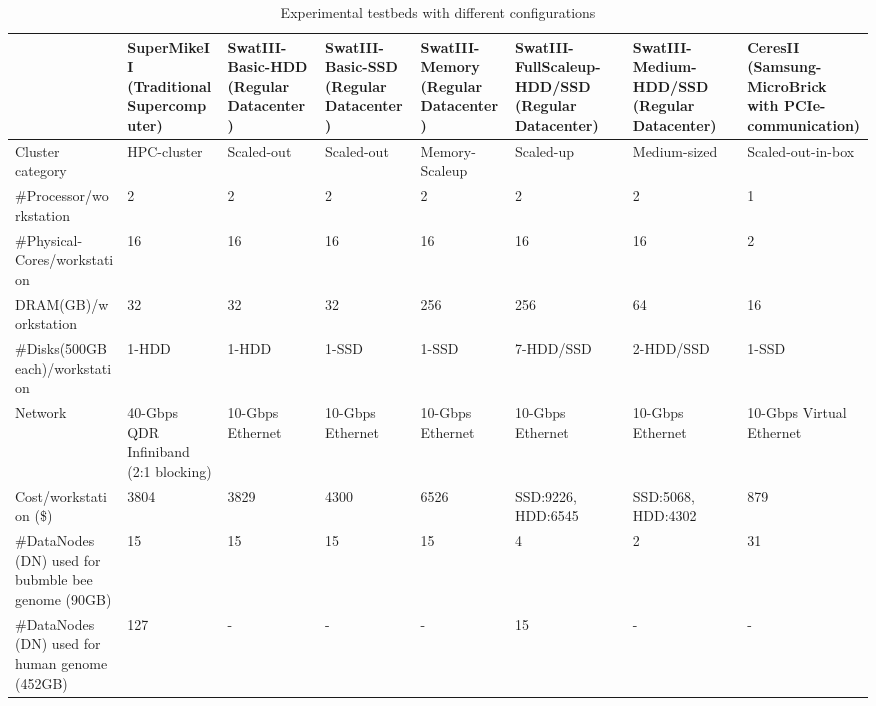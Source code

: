 \documentclass[conference]{IEEEtran}
\begin{document}
\begin{table}
\begin{center}
    \begin{tabular}{ |p{3.2cm} | p{1.6cm} | p{1.6cm} | p{1.6cm} | p{1.8cm} | p{1.6cm} | p{1.6cm}| p{1.9cm}|} \hline
    & SuperMikeII (Traditional Supercomputer) & SwatIII-Basic-HDD (Regular Datacenter) & SwatIII-Basic-SSD (Regular Datacenter)  & SwatIII-Memory (Regular Datacenter) & SwatIII-FullScaleup-HDD/SSD (Regular Datacenter) & SwatIII-Medium-HDD/SSD (Regular Datacenter) & CeresII (Samsung-MicroBrick with PCIe-communication) \\ \hline
    Cluster category & HPC-cluster & Scaled-out & Scaled-out & Memory-Scaleup & Scaled-up & Medium-sized & Scaled-out-in-box\\ \hline  
    \#Processor/workstation & 2 & 2 & 2 & 2 & 2 & 2 & 1 \\ \hline
    \#Physical-Cores/workstation & 16 & 16 & 16 & 16 & 16 & 16 & 2 \\ \hline %
    DRAM(GB)/workstation & 32 & 32 & 32 & 256 & 256 & 64 & 16  \\ \hline
    \#Disks(500GB each)/workstation & 1-HDD & 1-HDD & 1-SSD & 1-SSD & 7-HDD/SSD & 2-HDD/SSD & 1-SSD \\ \hline
    Network & 40-Gbps QDR Infiniband (2:1 blocking) & 10-Gbps Ethernet & 10-Gbps Ethernet & 10-Gbps Ethernet & 10-Gbps Ethernet & 10-Gbps Ethernet & 10-Gbps Virtual Ethernet\\ \hline %
   Cost/workstation (\$) & 3804 & 3829 & 4300 & 6526 & SSD:9226, HDD:6545 & SSD:5068, HDD:4302 & 879\\ \hline
    \#DataNodes (DN) used for bubmble bee genome (90GB) & 15 & 15 & 15 & 15 & 4 & 2 & 31 \\ \hline
    \#DataNodes (DN) used for human genome (452GB)& 127 & - & - & - & 15 & - & - \\ \hline
    \end{tabular}
    \caption{Experimental testbeds with different configurations}
	\label{table:Experimentaltestbeds}
\end{center}
\vspace{-1.5em}
\end{table}
\end{document}
